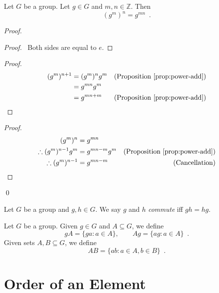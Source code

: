 \begin{prop}
    \label{prop:power-mult}
    Let $G$ be a group. Let $g \in G$ and $m,n \in \mathbb{Z}$. Then
    \[ (g^m)^n = g^{mn} \enspace . \]
\end{prop}

\begin{proof}
    \pf
    \begin{proof}
        \pf\ Both sides are equal to $e$.
    \end{proof}
    \begin{proof}
        \pf
        \begin{align*}
            (g^m)^{n+1} & = (g^m)^n g^m & (\text{Proposition \ref{prop:power-add}}) \\
                        & = g^{mn} g^m                                              \\
                        & = g^{mn + m}  & (\text{Proposition \ref{prop:power-add}})
        \end{align*}
    \end{proof}
    \begin{proof}
        \pf
        \begin{align*}
            (g^m)^n                    & = g^{mn}                                                   \\
            \therefore (g^m)^{n-1} g^m & = g^{mn-m} g^m & (\text{Proposition \ref{prop:power-add}}) \\
            \therefore (g^m)^{n-1}     & = g^{mn-m}     & (\text{Cancellation})
        \end{align*}
    \end{proof}
    \qed
\end{proof}

\begin{df}[Commute]
    Let $G$ be a group and $g,h \in G$. We say $g$ and $h$ \emph{commute} iff $gh = hg$.
\end{df}

\begin{df}
Let $G$ be a group. Given $g \in G$ and $A \subseteq G$, we define
\[ gA = \{ ga : a \in A \}, \qquad Ag = \{ ag : a \in A \} \enspace . \]
Given sets $A,B \subseteq G$, we define
\[ AB = \{ ab : a \in A, b \in B \} \enspace . \]
\end{df}

\section{Order of an Element}

